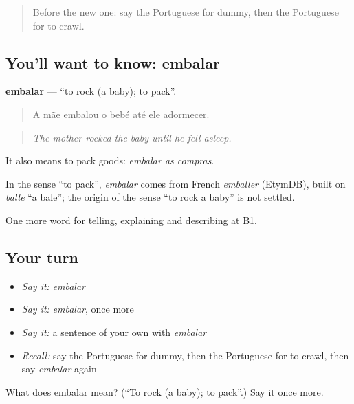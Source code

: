\label{lesson:PT-C494-embalar}



\begin{quote}
Before the new one: say the Portuguese for dummy, then the Portuguese for to crawl.
\end{quote}

\subsection*{You'll want to know: embalar}
\textbf{embalar} — \textquotedblleft{}to rock (a baby); to pack\textquotedblright{}.

\begin{quote}
A mãe embalou o bebé até ele adormecer.
\end{quote}

\begin{quote}
\emph{The mother rocked the baby until he fell asleep.}
\end{quote}

It also means to pack goods: \emph{embalar as compras}.

\begin{cousinweb}
In the sense \textquotedblleft{}to pack\textquotedblright{}, \emph{embalar} comes from French \emph{emballer} (EtymDB), built on \emph{balle} \textquotedblleft{}a bale\textquotedblright{}; the origin of the sense \textquotedblleft{}to rock a baby\textquotedblright{} is not settled.
\end{cousinweb}

\begin{grammarlens}[title={What you've built}]
One more word for telling, explaining and describing at B1.
\end{grammarlens}

\subsection*{Your turn}
\begin{itemize}
\raggedright
  \item \emph{Say it:} \emph{embalar}
  \item \emph{Say it:} \emph{embalar}, once more
  \item \emph{Say it:} a sentence of your own with \emph{embalar}
  \item \emph{Recall:} say the Portuguese for dummy, then the Portuguese for to crawl, then say \emph{embalar} again
\end{itemize}

\begin{tcolorbox}[breakable,colback=teal!4,colframe=teal!35!black,title={Before you move on}]
What does embalar mean? (\textquotedblleft{}To rock (a baby); to pack\textquotedblright{}.) Say it once more.
\end{tcolorbox}
